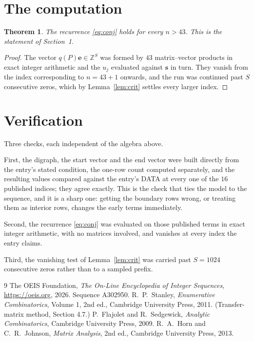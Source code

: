 \documentclass[11pt,a4paper]{article}
\theoremstyle{plain}
\newtheorem{theorem}{Theorem}
\theoremstyle{definition}
\begin{document}
\section{The computation}

\begin{theorem}
The recurrence \eqref{eq:conj} holds for every $n>43$. This is the statement of
Section~1.
\end{theorem}

\begin{proof}
The vector $q(P)\mathbf{e}\in\mathbb{Z}^{S}$ was formed by $43$ matrix--vector
products in exact integer arithmetic and the $u_j$ evaluated against $\mathbf{s}$ in turn.
They vanish from the index corresponding to $n=43+1$ onwards, and the run was continued
past $S$ consecutive zeros, which by Lemma~\ref{lem:crit} settles every larger index.
\end{proof}

\section{Verification}

Three checks, each independent of the algebra above.

First, the digraph, the start vector and the end vector were built directly from the
entry's stated condition, the one-row count computed separately, and the resulting values
compared against the entry's DATA at every one of the $16$ published indices; they
agree exactly. This is the check that ties the model to the sequence, and it is a sharp one:
getting the boundary rows wrong, or treating them as interior rows, changes the early terms
immediately.

Second, the recurrence \eqref{eq:conj} was evaluated on those published terms in exact
integer arithmetic, with no matrices involved, and vanishes at every index the entry claims.

Third, the vanishing test of Lemma~\ref{lem:crit} was carried past $S=1024$ consecutive
zeros rather than to a sampled prefix.

\begin{thebibliography}{9}
 The OEIS Foundation, \emph{The On-Line Encyclopedia of Integer
Sequences}, \url{https://oeis.org}, 2026. Sequence A302950.
 R.~P.~Stanley, \emph{Enumerative Combinatorics}, Volume 1, 2nd ed.,
Cambridge University Press, 2011. (Transfer-matrix method, Section 4.7.)
 P.~Flajolet and R.~Sedgewick, \emph{Analytic Combinatorics}, Cambridge
University Press, 2009.
 R.~A.~Horn and C.~R.~Johnson, \emph{Matrix Analysis}, 2nd ed., Cambridge
University Press, 2013.
\end{thebibliography}
\end{document}
